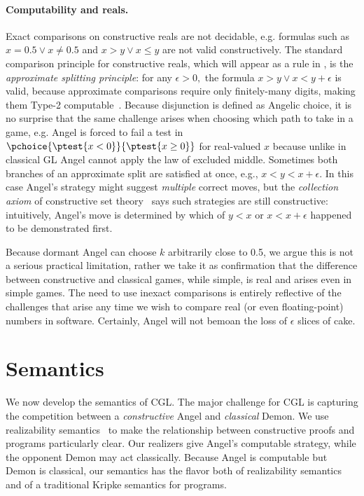\documentclass[12pt]{cmuthesis}
\theoremstyle{definition}
\theoremstyle{remark}
\newcommand{\rref}[2][]{\prettyref{#2}}
\newcommand{\CGL}{\textsf{CGL}\xspace}
\newcommand{\GL}{GL\xspace}
\begin{document}
\paragraph{Computability and reals.}
Exact comparisons on constructive reals are not decidable, e.g. formulas such as $x = 0.5 \lor x \neq 0.5$ and $x > y \lor x \leq y$ are not valid constructively.
The standard comparison principle for constructive reals, which will appear as a rule in \rref{sec:arith-proof}, is the \emph{approximate splitting principle}:
for any $\epsilon > 0,$ the formula $x > y \lor x < y + \epsilon$ is valid, because approximate comparisons require only finitely-many digits, making them Type-2 computable~\cite{DBLP:series/txtcs/Weihrauch00}.
Because disjunction is defined as Angelic choice, it is no surprise that the same challenge arises when choosing which path to take in a game, e.g. Angel is forced to fail a test in $\pchoice{\ptest{x < 0}}{\ptest{x \geq 0}}$ for real-valued $x$ because unlike in classical \GL Angel cannot apply the law of excluded middle.
Sometimes both branches of an approximate split are satisfied at once, e.g., $x < y < x + \epsilon$.
In this case Angel's strategy might suggest \emph{multiple} correct moves, but the \emph{collection axiom} of constructive set theory~\cite{DBLP:journals/mst/Schwichtenberg08,bishop1967foundations,bridges2007techniques} says such strategies are still constructive: intuitively, Angel's move is determined by which of $y < x$ or $x < x + \epsilon$ happened to be demonstrated first.

Because dormant Angel can choose $k$ arbitrarily close to 0.5, we argue this is not a serious practical limitation, rather we take it as confirmation that the difference between constructive and classical games, while simple, is real and arises even in simple games.
The need to use inexact comparisons is entirely reflective of the challenges that arise any time we wish to compare real (or even floating-point) numbers in software.
Certainly, Angel will not bemoan the loss of $\epsilon$ slices of cake.





\section{Semantics}
\label{sec:rel-sem}
We now develop the semantics of \CGL.
The major  challenge for \CGL is capturing the competition between a \emph{constructive} Angel and \emph{classical} Demon.
We use realizability semantics~\cite{DBLP:journals/mscs/Oosten02,lipton1992constructive} to make the relationship between constructive proofs and programs particularly clear.
Our realizers give Angel's computable strategy, while the opponent Demon may act classically.
Because Angel is computable but Demon is classical, our semantics has the flavor both of realizability semantics and of a traditional Kripke semantics for programs.
\end{document}
